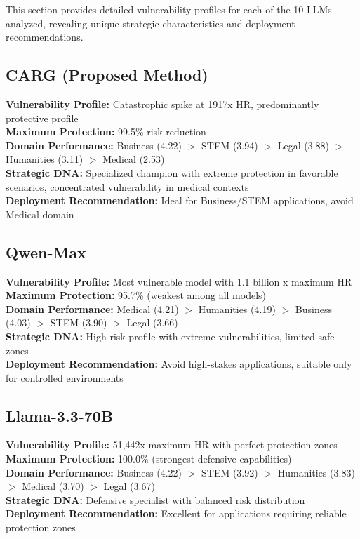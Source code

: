 \documentclass[letterpaper]{article}
\begin{document}
This section provides detailed vulnerability profiles for each of the 10 LLMs analyzed, revealing unique strategic characteristics and deployment recommendations.

\subsection{CARG (Proposed Method)}
\textbf{Vulnerability Profile:} Catastrophic spike at 1917x HR, predominantly protective profile\\
\textbf{Maximum Protection:} 99.5\% risk reduction\\
\textbf{Domain Performance:} Business (4.22) $>$ STEM (3.94) $>$ Legal (3.88) $>$ Humanities (3.11) $>$ Medical (2.53)\\
\textbf{Strategic DNA:} Specialized champion with extreme protection in favorable scenarios, concentrated vulnerability in medical contexts\\
\textbf{Deployment Recommendation:} Ideal for Business/STEM applications, avoid Medical domain

\subsection{Qwen-Max}
\textbf{Vulnerability Profile:} Most vulnerable model with 1.1 billion x maximum HR\\
\textbf{Maximum Protection:} 95.7\% (weakest among all models)\\
\textbf{Domain Performance:} Medical (4.21) $>$ Humanities (4.19) $>$ Business (4.03) $>$ STEM (3.90) $>$ Legal (3.66)\\
\textbf{Strategic DNA:} High-risk profile with extreme vulnerabilities, limited safe zones\\
\textbf{Deployment Recommendation:} Avoid high-stakes applications, suitable only for controlled environments

\subsection{Llama-3.3-70B}
\textbf{Vulnerability Profile:} 51,442x maximum HR with perfect protection zones\\
\textbf{Maximum Protection:} 100.0\% (strongest defensive capabilities)\\
\textbf{Domain Performance:} Business (4.22) $>$ STEM (3.92) $>$ Humanities (3.83) $>$ Medical (3.70) $>$ Legal (3.67)\\
\textbf{Strategic DNA:} Defensive specialist with balanced risk distribution\\
\textbf{Deployment Recommendation:} Excellent for applications requiring reliable protection zones
\end{document}
